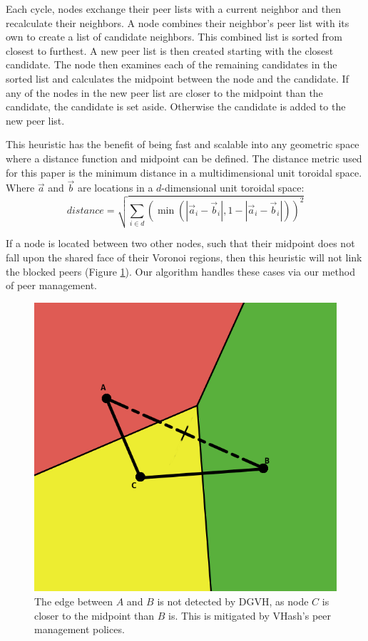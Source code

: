 \documentclass[10pt, conference, letterpaper]{IEEEtran}
\begin{document}
Each cycle, nodes exchange their peer lists with a current neighbor and then recalculate their neighbors.  
A node combines their neighbor's peer list with its own to create a list of candidate neighbors.
This combined list is sorted from closest to furthest.
A new peer list is then created starting with the closest candidate.
The node then examines each of the remaining candidates in the sorted list and calculates the midpoint between the node and the candidate.
If any of the nodes in the new peer list are closer to the midpoint than the candidate, the candidate is set aside.  
Otherwise the candidate is added to the new peer list.

This heuristic has the benefit of being fast and scalable into any geometric space where a distance function and midpoint can be defined.
The distance metric used for this paper is the minimum distance in a multidimensional unit toroidal space.
Where $\vec{a}$ and $\vec{b}$ are locations in a $d$-dimensional unit toroidal space:
\[ distance = \sqrt{\sum\limits_{i\in d} (\min(|\vec{a}_i-\vec{b}_i|, 1-|\vec{a}_i-\vec{b}_i|))^2}\]


If a node is located between two other nodes, such that their midpoint does not fall upon the shared face of their Voronoi regions, then this heuristic will not link the blocked peers  (Figure \ref{occ-ex}).
Our algorithm handles these cases via our method of peer management.

\begin{figure}
	\centering
	\includegraphics[width=\linewidth]{occlusion}
	\caption{The edge between $A$ and $B$ is not detected by DGVH, as node $C$ is closer to the midpoint than $B$ is.  This is mitigated by VHash's peer management polices.}  %
	\label{occ-ex}
\end{figure}
\end{document}
